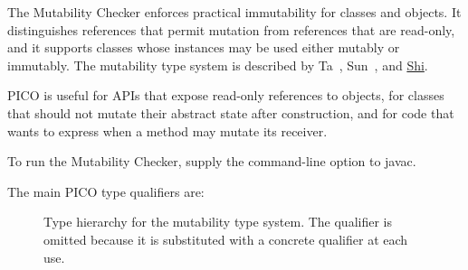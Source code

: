 \htmlhr
{}

The Mutability Checker enforces practical immutability for classes and objects.
It distinguishes references that permit mutation from references that are
read-only, and it supports classes whose instances may be used either
mutably or immutably.
The mutability type system is described by Ta~\cite{Ta2018},
Sun~\cite{Sun2021}, and
\href{https://uwspace.uwaterloo.ca/items/990ef07b-60be-420c-98ac-321ee7ad071c}{Shi}.

PICO is useful for APIs that expose read-only references to objects, for classes
that should not mutate their abstract state after construction, and for
code that wants to express when a method may mutate its receiver.

To run the Mutability Checker, supply the
command-line option to javac.


The main PICO type qualifiers are:

\begin{figure}
\caption{Type hierarchy for the mutability type system.
  The  qualifier is omitted
  because it is substituted with a concrete qualifier at each use.}
\label{fig-pico-hierarchy}
\end{figure}


